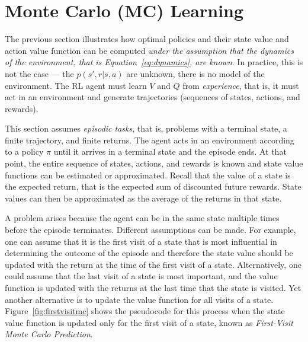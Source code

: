 \section{Monte Carlo (MC) Learning}

The previous section illustrates how optimal policies and their state value and action value function can be computed \emph{under the assumption that the dynamics of the environment, that is Equation~\ref{eq:dynamics}, are known}. In practice, this is not the case --- the $p(s', r | s, a)$ are unknown, there is no model of the environment. The RL agent must learn $V$ and $Q$ from \emph{experience}, that is, it must act in an environment and generate trajectories (sequences of states, actions, and rewards). 

This section assumes \emph{episodic tasks}, that is, problems with a terminal state, a finite trajectory, and finite returns. The agent acts in an environment according to a policy $\pi$ until it arrives in a terminal state and the episode ends. At that point, the entire sequence of states, actions, and rewards is known and state value functions can be estimated or approximated. Recall that the value of a state is the expected return, that is the expected sum of discounted future rewards. State values can then be approximated as the average of the returns in that state. 

A problem arises because the agent can be in the same state multiple times before the episode terminates. Different assumptions can be made. For example, one can assume that it is the first visit of a state that is most influential in determining the outcome of the episode and therefore the state value should be updated with the return at the time of the first visit of a state. Alternatively, one could assume that the last visit of a state is most important, and the value function is updated with the returns at the last time that the state is visited. Yet another alternative is to update the value function for all visits of a state. Figure~\ref{fig:firstvisitmc} shows the pseudocode for this process when the state value function is updated only for the first visit of a state, known as \emph{First-Visit Monte Carlo Prediction}.

